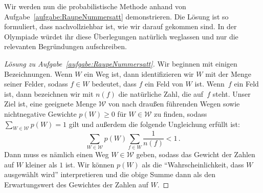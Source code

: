 Wir werden nun die probabilistische Methode anhand von Aufgabe~\ref{aufgabe:RaupeNummersatt} demonstrieren. Die Lösung ist so formuliert, dass nachvollziehbar ist, wie wir darauf gekommen sind. In der Olympiade würdet ihr diese Überlegungen natürlich weglassen und nur die relevanten Begründungen aufschreiben.

\begin{proof}[Lösung zu Aufgabe~\ref{aufgabe:RaupeNummersatt}]
	Wir beginnen mit einigen Bezeichnungen. Wenn $W$ ein Weg ist, dann identifizieren wir $W$ mit der Menge seiner Felder, sodass $f\in W$ bedeutet, dass $f$ ein Feld von $W$ ist. Wenn~$f$ ein Feld ist, dann bezeichnen wir mit $n(f)$ die natürliche Zahl, die auf~$f$ steht. Unser Ziel ist, eine geeignete Menge $\mathcal W$ von nach draußen führenden Wegen sowie nichtnegative Gewichte $p(W)\geqslant 0$ für $W\in\mathcal W$ zu finden, sodass $\sum_{W\in \mathcal W}p(W)=1$ gilt und außerdem die folgende Ungleichung erfüllt ist:
	\begin{equation*}
		\sum_{W\in \mathcal{W}} p(W)\sum_{f\in W} \frac{1}{n(f)}<1\,.
	\end{equation*}
	Dann muss es nämlich einen Weg $W\in\mathcal W$ geben, sodass das Gewicht der Zahlen auf $W$ kleiner als $1$ ist. Wir können $p(W)$ als die \enquote{Wahrscheinlichkeit, dass $W$ ausgewählt wird} interpretieren und die obige Summe dann als den Erwartungswert des Gewichtes der Zahlen auf $W$.
	

\end{proof}
